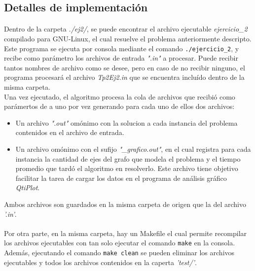 \subsection{Detalles de implementación}
\label{imp2}

\paragraph{}
Dentro de la carpeta \textit{./ej2/}, se puede encontrar el archivo ejecutable \textit{ejercicio\_2} compilado para GNU-Linux, el cual resuelve el problema anteriormente descripto. Este programa se ejecuta por consola mediante el comando \texttt{./ejercicio\_2}, y recibe como parámetro los archivos de entrada \textit{".in"} a procesar. Puede recibir tantos nombres de archivo como se desee, pero en caso de no recibir ninguno, el programa procesará el archivo \textit{Tp2Ej2.in} que se encuentra incluído dentro de la misma carpeta. \\
Una vez ejecutado, el algoritmo procesa la cola de archivos que recibió como parámertos de a uno por vez generando para cada uno de ellos dos archivos:
	\begin{itemize}
		\item{Un archivo \textit{".out"} omónimo con la solucion a cada instancia del problema contenidos en el archivo de entrada.}
		\item{Un archivo omónimo con el sufijo \textit{"\_grafico.out"}, en el cual registra para cada instancia la cantidad de ejes del grafo que modela el problema y el tiempo promedio que tardó el algoritmo en resolverlo. Este archivo tiene objetivo facilitar la tarea de cargar los datos en el programa de análisis gráfico \textit{QtiPlot}}.
	\end{itemize}

Ambos archivos son guardados en la misma carpeta de origen que la del archivo \textit{'.in'}.

\paragraph{}		
Por otra parte, en la misma carpeta, hay un Makefile el cual permite recompilar los archivos ejecutables con tan solo ejecutar el comando \texttt{make} en la consola. Además, ejecutando el comando \texttt{make clean} se pueden eliminar los archivos ejecutables y todos los archivos contenidos en la caperta \textit{'test/'}. 

